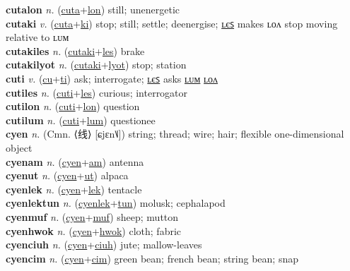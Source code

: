 \textbf{cutalon} \textit{n.} (\hyperref[cuta]{cuta}+\hyperref[lon]{lon})
still; unenergetic \label{cutalon} \\
\textbf{cutaki} \textit{v.} (\hyperref[cuta]{cuta}+\hyperref[ki]{ki})
stop; still; settle; deenergise; \hyperref[cutakiles]{ʟєꜱ} makes ʟᴏᴧ stop moving relative to ʟᴜᴍ \label{cutaki} \\
\textbf{cutakiles} \textit{n.} (\hyperref[cutaki]{cutaki}+\hyperref[les]{les})
brake \label{cutakiles} \\
\textbf{cutakilyot} \textit{n.} (\hyperref[cutaki]{cutaki}+\hyperref[lyot]{lyot})
stop; station \label{cutakilyot} \\
\textbf{cuti} \textit{v.} (\hyperref[cu]{cu}+\hyperref[ti]{ti})
ask; interrogate; \hyperref[cutiles]{ʟєꜱ} asks \hyperref[cutilum]{ʟᴜᴍ} \hyperref[cutilon]{ʟᴏᴧ} \label{cuti} \\
\textbf{cutiles} \textit{n.} (\hyperref[cuti]{cuti}+\hyperref[les]{les})
curious; interrogator \label{cutiles} \\
\textbf{cutilon} \textit{n.} (\hyperref[cuti]{cuti}+\hyperref[lon]{lon})
question \label{cutilon} \\
\textbf{cutilum} \textit{n.} (\hyperref[cuti]{cuti}+\hyperref[lum]{lum})
questionee \label{cutilum} \\
\textbf{cyen} \textit{n.} (Cmn. ⟨线⟩ [ɕjɛn˥˩])
string; thread; wire; hair; flexible one-dimensional object \label{cyen} \\
\textbf{cyenam} \textit{n.} (\hyperref[cyen]{cyen}+\hyperref[am]{am})
antenna \label{cyenam} \\
\textbf{cyenut} \textit{n.} (\hyperref[cyen]{cyen}+\hyperref[ut]{ut})
alpaca \label{cyenut} \\
\textbf{cyenlek} \textit{n.} (\hyperref[cyen]{cyen}+\hyperref[lek]{lek})
tentacle \label{cyenlek} \\
\textbf{cyenlektun} \textit{n.} (\hyperref[cyenlek]{cyenlek}+\hyperref[tun]{tun})
molusk; cephalapod \label{cyenlektun} \\
\textbf{cyenmuf} \textit{n.} (\hyperref[cyen]{cyen}+\hyperref[muf]{muf})
sheep; mutton \label{cyenmuf} \\
\textbf{cyenhwok} \textit{n.} (\hyperref[cyen]{cyen}+\hyperref[hwok]{hwok})
cloth; fabric \label{cyenhwok} \\
\textbf{cyenciuh} \textit{n.} (\hyperref[cyen]{cyen}+\hyperref[ciuh]{ciuh})
jute; mallow-leaves \label{cyenciuh} \\
\textbf{cyencim} \textit{n.} (\hyperref[cyen]{cyen}+\hyperref[cim]{cim})
green bean; french bean; string bean; snap \label{cyencim} \\

